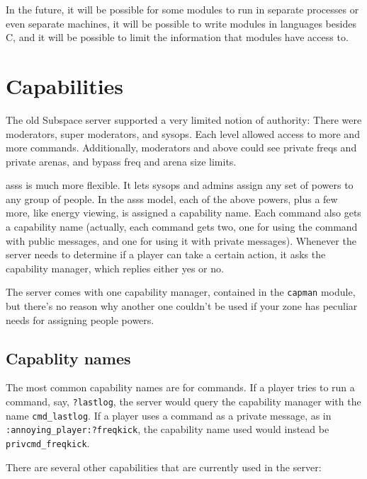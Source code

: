 \documentclass{article}
\newcommand{\asss}{asss}
\begin{document}
In the future, it will be possible for some modules to run in separate
processes or even separate machines, it will be possible to write
modules in languages besides C, and it will be possible to limit the
information that modules have access to.


\section{Capabilities}

The old Subspace server supported a very limited notion of authority:
There were moderators, super moderators, and sysops. Each level allowed
access to more and more commands. Additionally, moderators and above
could see private freqs and private arenas, and bypass freq and arena
size limits.

\asss{} is much more flexible. It lets sysops and admins assign any set
of powers to any group of people. In the \asss{} model, each of the
above powers, plus a few more, like energy viewing, is assigned a
capability name. Each command also gets a capability name (actually,
each command gets two, one for using the command with public messages,
and one for using it with private messages). Whenever the server needs
to determine if a player can take a certain action, it asks the
capability manager, which replies either yes or no.

The server comes with one capability manager, contained in the
\texttt{capman} module, but there's no reason why another one couldn't
be used if your zone has peculiar needs for assigning people powers.

\subsection{Capablity names}

The most common capability names are for commands. If a player tries
to run a command, say, \verb/?lastlog/, the server would query the
capability manager with the name \verb/cmd_lastlog/. If a player uses a
command as a private message, as in \verb/:annoying_player:?freqkick/,
the capability name used would instead be \verb/privcmd_freqkick/.

There are several other capabilities that are currently used in the
server:
\end{document}
